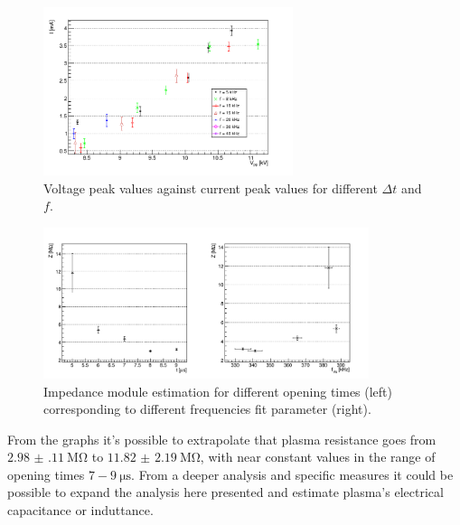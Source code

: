\begin{figure}
 \centering
 \includegraphics[width=0.65\textwidth]{Images/Electric/VI_B.png}
 \caption{Voltage peak values against current peak values for different $\Delta t$ and $f$.}
 \label{fig:viplot}
\end{figure}

\begin{figure}
 \centering
 \includegraphics[width=0.85\textwidth]{Images/Electric/z_f8.png}
 \caption{Impedance module estimation for different opening times (left) corresponding to different frequencies fit parameter (right).}
 \label{fig:zest}
\end{figure}

From the graphs it's possible to extrapolate that plasma resistance goes from $\SI{2.98(11)}{\mega\ohm}$ to $\SI{11.82(219)}{\mega\ohm}$, with near constant values in the range of opening times $7-\SI{9}{\micro\second}$.
From a deeper analysis and specific measures it could be possible to expand the analysis here presented and estimate plasma's electrical capacitance or induttance.




